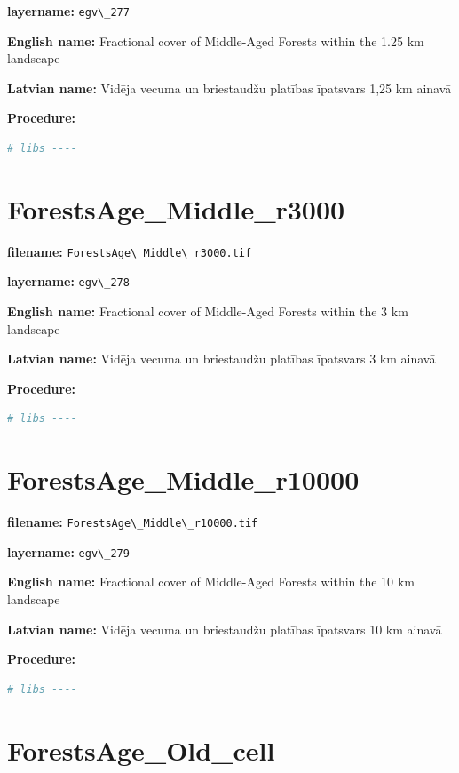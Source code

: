\documentclass[
]{book}
\newcommand{\passthrough}[1]{#1}
\begin{document}
\textbf{layername:} \passthrough{\lstinline!egv\_277!}

\textbf{English name:} Fractional cover of Middle-Aged Forests within the 1.25 km landscape

\textbf{Latvian name:} Vidēja vecuma un briestaudžu platības īpatsvars 1,25 km ainavā

\textbf{Procedure:}

\begin{lstlisting}[language=R]
# libs ----
\end{lstlisting}

\section{ForestsAge\_Middle\_r3000}\label{ch06.278}

\textbf{filename:} \passthrough{\lstinline!ForestsAge\_Middle\_r3000.tif!}

\textbf{layername:} \passthrough{\lstinline!egv\_278!}

\textbf{English name:} Fractional cover of Middle-Aged Forests within the 3 km landscape

\textbf{Latvian name:} Vidēja vecuma un briestaudžu platības īpatsvars 3 km ainavā

\textbf{Procedure:}

\begin{lstlisting}[language=R]
# libs ----
\end{lstlisting}

\section{ForestsAge\_Middle\_r10000}\label{ch06.279}

\textbf{filename:} \passthrough{\lstinline!ForestsAge\_Middle\_r10000.tif!}

\textbf{layername:} \passthrough{\lstinline!egv\_279!}

\textbf{English name:} Fractional cover of Middle-Aged Forests within the 10 km landscape

\textbf{Latvian name:} Vidēja vecuma un briestaudžu platības īpatsvars 10 km ainavā

\textbf{Procedure:}

\begin{lstlisting}[language=R]
# libs ----
\end{lstlisting}

\section{ForestsAge\_Old\_cell}\label{ch06.280}
\end{document}
